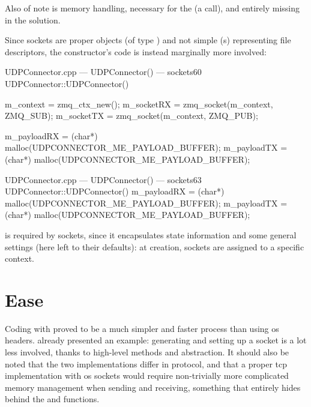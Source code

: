 \FLOATnoindent Also of note is memory handling, necessary for the   (a  call), and entirely missing in the  solution.

Since  sockets are proper objects (of type ) and not simple (s) representing file descriptors, the constructor's code is instead marginally more involved:

\begin{codelist}{UDPConnector.cpp --- UDPConnector() ---  sockets}{60}
UDPConnector::UDPConnector() {
	m_context  = zmq_ctx_new();
	m_socketRX = zmq_socket(m_context, ZMQ_SUB);
	m_socketTX = zmq_socket(m_context, ZMQ_PUB);

	m_payloadRX = (char*) malloc(UDPCONNECTOR_ME_PAYLOAD_BUFFER);
	m_payloadTX = (char*) malloc(UDPCONNECTOR_ME_PAYLOAD_BUFFER);
}
\end{codelist}

\begin{codelist}{UDPConnector.cpp --- UDPConnector() ---  sockets}{63}
UDPConnector::UDPConnector() {
	m_payloadRX = (char*) malloc(UDPCONNECTOR_ME_PAYLOAD_BUFFER);
	m_payloadTX = (char*) malloc(UDPCONNECTOR_ME_PAYLOAD_BUFFER);
}
\end{codelist} %

\FLOATnoindent {} is required by  sockets, since it encapsulates state information and some general settings (here left to their defaults): at creation, sockets are assigned to a specific context.

\section{Ease}\label{sc:code:ease}

Coding with  proved to be a much simpler and faster process than using \gls{os} headers.  already presented an example: generating and setting up a socket is a lot less involved, thanks to high-level methods and abstraction. It should also be noted that the two implementations differ in protocol, and that a proper \gls{tcp} implementation with \gls{os} sockets would require non-trivially more complicated memory management when sending and receiving, something that  entirely hides behind the  and  functions.

